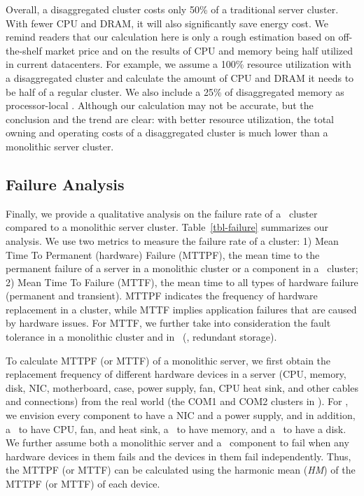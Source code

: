 \documentclass[10pt,times,twocolumn]{z2-article}
\begin{document}
{{{{{{{Overall, a disaggregated cluster costs only 50\% of a traditional server cluster.
With fewer CPU and DRAM, it will also significantly save energy cost.
We remind readers that our calculation here is only a rough estimation based on off-the-shelf market price
and on the results of CPU and memory being half utilized in current datacenters.
For example, we assume a 100\% resource utilization with a disaggregated cluster
and calculate the amount of CPU and DRAM it needs to be half of a regular cluster.
We also include a 25\% of disaggregated memory as processor-local \excache.
Although our calculation may not be accurate, but the conclusion and the trend are clear:
with better resource utilization, the total owning and operating costs of a disaggregated cluster is much lower than a monolithic server cluster. 
\fi

\subsection{Failure Analysis}
\label{sec:failure-results}
Finally, we provide a qualitative analysis on the failure rate of a \lego\ cluster compared to a monolithic server cluster.
Table~\ref{tbl-failure} summarizes our analysis.
We use two metrics to measure the failure rate of a cluster: 
1) Mean Time To Permanent (hardware) Failure (MTTPF), the mean time to the permanent failure of a server in a monolithic cluster
or a component in a \lego\ cluster;
2) Mean Time To Failure (MTTF), the mean time to all types of hardware failure (permanent and transient).
MTTPF indicates the frequency of hardware replacement in a cluster, 
while MTTF implies application failures that are caused by hardware issues.
For MTTF, we further take into consideration the fault tolerance in a monolithic cluster and in \lego\ (\eg, redundant storage).

To calculate MTTPF (or MTTF) of a monolithic server, we first obtain the replacement frequency of different hardware devices in a server
(CPU, memory, disk, NIC, motherboard, case, power supply, fan, CPU heat sink, and other cables and connections)
from the real world (the COM1 and COM2 clusters in \cite{Failure-Disk-FAST07}).
For \lego, we envision every component to have a NIC and a power supply, 
and in addition, a \pcomponent\ to have CPU, fan, and heat sink, a \mcomponent\ to have memory, and a \scomponent\ to have a disk.
We further assume both a monolithic server and a \lego\ component to fail when any hardware devices in them fails
and the devices in them fail independently.
Thus, the MTTPF (or MTTF) can be calculated using the harmonic mean ({\em HM}) 
of the MTTPF (or MTTF) of each device.

}}}}}}}
\end{document}
